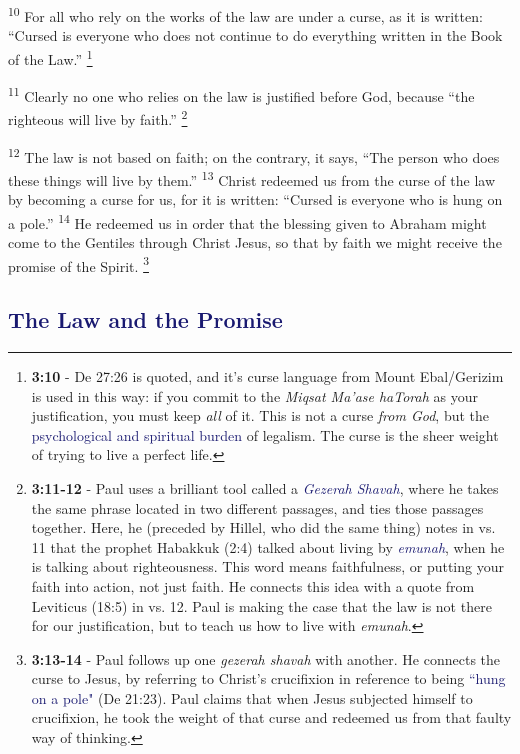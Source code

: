 \documentclass[12pt,twoside]{article}
\newcommand{\vs}[1]{\textsuperscript{#1}}
\newcommand{\vnote}[2]{%
  \begingroup
  \renewcommand\thefootnote{}%
  \footnote{\scriptsize \textbf{}#2}%
  \addtocounter{footnote}{-1}%
  \endgroup
}
\begin{document}
 \vs{10} For all who rely on the works of the law are under a curse, as it is written: ``Cursed is everyone who does not continue to do everything written in the Book of the Law.''\vnote{10}{\textbf{3:10} - De 27:26 is quoted, and it's curse language from Mount Ebal/Gerizim is used in this way: if you commit to the \textit{Miqsat Ma'ase haTorah} as your justification, you must keep \textit{all} of it. This is not a curse \textit{from God}, but the \textcolor{MidnightBlue}{psychological and spiritual burden} of legalism. The curse is the sheer weight of trying to live a perfect life.}
 \vs{11} Clearly no one who relies on the law is justified before God, because ``the righteous will live by faith.''\vnote{11}{\textbf{3:11-12} - Paul uses a brilliant tool called a \textcolor{MidnightBlue}{\textit{Gezerah Shavah}}, where he takes the same phrase located in two different passages, and ties those passages together. Here, he (preceded by Hillel, who did the same thing) notes in vs. 11 that the prophet Habakkuk (2:4) talked about living by \textcolor{MidnightBlue}{\textit{emunah}}, when he is talking about righteousness. This word means faithfulness, or putting your faith into action, not just faith. He connects this idea with a quote from Leviticus (18:5) in vs. 12. Paul is making the case that the law is not there for our justification, but to teach us how to live with \textit{emunah}.}
 \vs{12} The law is not based on faith; on the contrary, it says, ``The person who does these things will live by them.''
 \vs{13} Christ redeemed us from the curse of the law by becoming a curse for us, for it is written: ``Cursed is everyone who is hung on a pole.''
 \vs{14} He redeemed us in order that the blessing given to Abraham might come to the Gentiles through Christ Jesus, so that by faith we might receive the promise of the Spirit.\vnote{14}{\textbf{3:13-14} - Paul follows up one \textit{gezerah shavah} with another. He connects the curse to Jesus, by referring to Christ's crucifixion in reference to being \textcolor{MidnightBlue}{``hung on a pole"} (De 21:23). Paul claims that when Jesus subjected himself to crucifixion, he took the weight of that curse and redeemed us from that faulty way of thinking.}

 \subsection*{\textcolor{MidnightBlue}{\textbf{The Law and the Promise}}}
\end{document}
